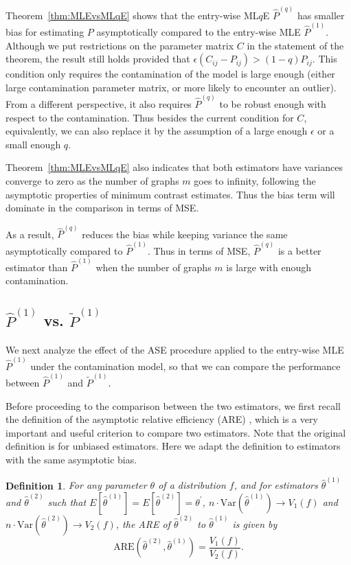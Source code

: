 \documentclass[a4paper]{article}
\newtheorem{definition}[fact]{Definition}
\renewcommand{\hat}{\widehat}
\begin{document}
Theorem~\ref{thm:MLEvsMLqE} shows that the entry-wise ML$q$E $\hat{P}^{(q)}$ has smaller bias for estimating $P$ asymptotically compared to the entry-wise MLE $\hat{P}^{(1)}$. Although we put restrictions on the parameter matrix $C$ in the statement of the theorem, the result still holds provided that $\epsilon (C_{ij} - P_{ij}) > (1 - q) P_{ij}$. This condition only requires the contamination of the model is large enough (either large contamination parameter matrix, or more likely to encounter an outlier). From a different perspective, it also requires $\hat{P}^{(q)}$ to be robust enough with respect to the contamination. Thus besides the current condition for $C$, equivalently, we can also replace it by the assumption of a large enough $\epsilon$ or a small enough $q$.

Theorem~\ref{thm:MLEvsMLqE} also indicates that both estimators have variances converge to zero as the number of graphs $m$ goes to infinity, following the asymptotic properties of minimum contrast estimates. Thus the bias term will dominate in the comparison in terms of MSE.

As a result, $\hat{P}^{(q)}$ reduces the bias while keeping variance the same asymptotically compared to $\hat{P}^{(1)}$. Thus in terms of MSE, $\hat{P}^{(q)}$ is a better estimator than $\hat{P}^{(1)}$ when the number of graphs $m$ is large with enough contamination.

\subsection{$\hat{P}^{(1)}$ vs. $\widetilde{P}^{(1)}$}
We next analyze the effect of the ASE procedure applied to the entry-wise MLE $\hat{P}^{(1)}$ under the contamination model, so that we can compare the performance between $\hat{P}^{(1)}$ and $\widetilde{P}^{(1)}$.

Before proceeding to the comparison between the two estimators, we first recall the definition of the asymptotic relative efficiency (ARE) \citep{serfling2011asymptotic}, which is a very important and useful criterion to compare two estimators. Note that the original definition is for unbiased estimators. Here we adapt the definition to estimators with the same asymptotic bias.
\begin{definition}
For any parameter $\theta$ of a distribution $f$, and for estimators $\hat{\theta}^{(1)}$ and $\hat{\theta}^{(2)}$ such that $E[\hat{\theta}^{(1)}] = E[\hat{\theta}^{(2)}] = \theta^{\prime}$, $n \cdot \mathrm{Var}(\hat{\theta}^{(1)}) \to V_1(f)$ and $n \cdot \mathrm{Var}(\hat{\theta}^{(2)}) \to V_2(f)$, the ARE of $\hat{\theta}^{(2)}$ to $\hat{\theta}^{(1)}$ is given by
\[
	\mathrm{ARE}(\hat{\theta}^{(2)}, \hat{\theta}^{(1)}) = \frac{V_1(f)}{V_2(f)}.
\]
\end{definition}
\end{document}
